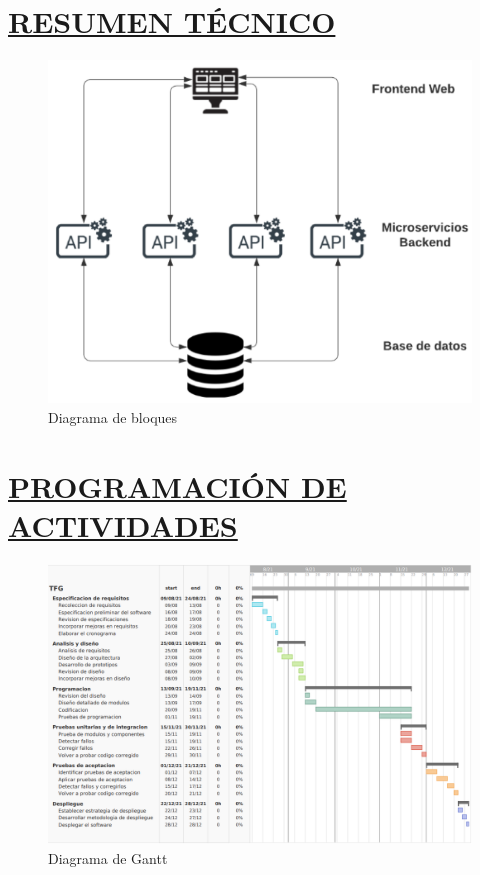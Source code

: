 \section*{\underline{RESUMEN TÉCNICO}}
\begin{figure}[H]
	\centering
	\includegraphics[width=\textwidth]{imagenes/resumen_tecnico.png} 
	\caption{Diagrama de bloques}
\end{figure}

\section*{\underline{PROGRAMACIÓN DE ACTIVIDADES}}

\begin{figure}[H]
	\centering
	\includegraphics[width=\textwidth]{imagenes/gantt.png} 
	\caption{Diagrama de Gantt}
\end{figure}


